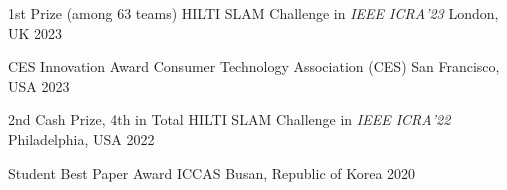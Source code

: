 



\begin{cvhonors}

  \cvhonor
    {1st Prize (among 63 teams)} %
    {HILTI SLAM Challenge in \textit{IEEE ICRA'23}} %
    {London, UK} %
    {2023} %

  \cvhonor
    {CES Innovation Award} %
    {Consumer Technology Association (CES)} %
    {San Francisco, USA} %
    {2023} %

  \cvhonor
    {2nd Cash Prize, 4th in Total} %
    {HILTI SLAM Challenge in \textit{IEEE ICRA'22}} %
    {Philadelphia, USA} %
    {2022} %

  \cvhonor
    {Student Best Paper Award} %
    {ICCAS} %
    {Busan, Republic of Korea} %
    {2020} %

\end{cvhonors}




